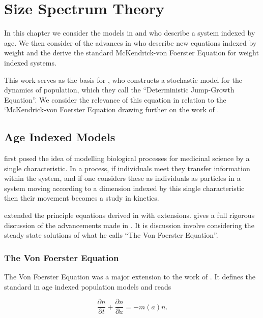\documentclass[../main.tex]{subfiles}
\begin{document}
  \chapter{Size Spectrum Theory}\label{chapter:sizetheory}

  In this chapter we consider the models in \cite{mckendrick1926} and \cite{foerster1959} who describe a system indexed by age. We then consider of the advances in \cite{silvert1978} who describe new equations indexed by weight and the derive the standard McKendrick-von Foerster Equation for weight indexed systems.

  This work serves as the basis for \cite{datta2010}, who constructs a stochastic model for the dynamics of population, which they call the ``Deterministic Jump-Growth Equation''. We consider the relevance of this equation in relation to the `McKendrick-von Foerster Equation drawing further on the work of \cite{datta2010}.

  \section{Age Indexed Models}
  \cite{mckendrick1926} first posed the idea of modelling biological processes for medicinal science by a single characteristic. In a process, if individuals meet they transfer information within the system, and if one considers these as individuals as particles in a system moving according to a dimension indexed by this single characteristic then their movement becomes a study in kinetics.

  \cite{foerster1959} extended the principle equations derived in \cite{mckendrick1926} with extensions. \cite{trucco1965} gives a full rigorous discussion of the advancements made in \cite{foerster1959}. It is discussion involve considering the steady state solutions of what he calls ``The Von Foerster Equation''.

  \subsection{The Von Foerster Equation}

  The Von Foerster Equation was a major extension to the work of \cite{mckendrick1926}. It defines the standard in age indexed population models and reads

  \begin{equation}\label{theory:eq:vf}
    \frac{\partial n}{\partial t} + \frac{\partial n}{\partial a} = - m(a)n.
  \end{equation}
\end{document}
